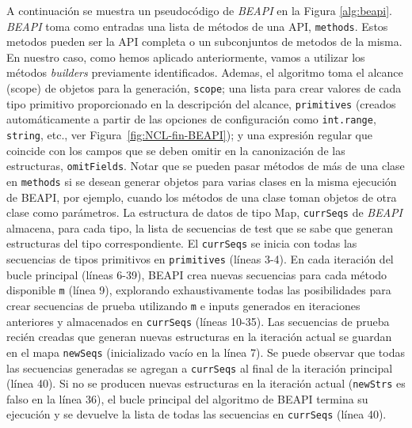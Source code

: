 A continuación se muestra un pseudocódigo de \emph{BEAPI} en la Figura \ref{alg:beapi}. \emph{BEAPI} toma como entradas una lista de métodos de una API,  \texttt{methods}. Estos metodos pueden ser la API completa o un subconjuntos de metodos de la misma. En nuestro caso, como hemos aplicado anteriormente, vamos a utilizar los métodos \emph{builders} previamente identificados. Ademas, el algoritmo toma el alcance (scope) de objetos para la generación, \texttt{scope}; una lista para crear valores de cada tipo primitivo proporcionado en la descripción del alcance, \texttt{primitives} (creados automáticamente a partir de las opciones de configuración como \texttt{int.range}, \texttt{string}, etc., ver Figura~\ref{fig:NCL-fin-BEAPI}); y una expresión regular que coincide con los campos que se deben omitir en la canonización de las estructuras, \texttt{omitFields}. Notar que se pueden pasar métodos de más de una clase en \texttt{methods} si se desean generar objetos para varias clases en la misma ejecución de \textsf{BEAPI}, por ejemplo, cuando los métodos de una clase toman objetos de otra clase como parámetros. La estructura de datos de tipo Map, \texttt{currSeqs} de \emph{BEAPI}  almacena, para cada tipo, la lista de secuencias de test que se sabe que generan estructuras del tipo correspondiente. El \texttt{currSeqs} se inicia con todas las secuencias de tipos primitivos en \texttt{primitives} (líneas 3-4). En cada iteración del bucle principal (líneas 6-39), \textsf{BEAPI}  crea nuevas secuencias para cada método disponible \texttt{m} (línea 9), explorando exhaustivamente todas las posibilidades para crear secuencias de prueba utilizando \texttt{m} e inputs generados en iteraciones anteriores y almacenados en \texttt{currSeqs} (líneas 10-35). Las secuencias de prueba recién creadas que generan nuevas estructuras en la iteración actual se guardan en el mapa \texttt{newSeqs} (inicializado vacío en la línea 7). Se puede observar que todas las secuencias generadas se agregan a \texttt{currSeqs} al final de la iteración principal (línea 40). Si no se producen nuevas estructuras en la iteración actual (\texttt{newStrs} es falso en la línea 36), el bucle principal del algoritmo de  \textsf{BEAPI}  termina su ejecución y se devuelve la lista de todas las secuencias en \texttt{currSeqs} (línea 40).


